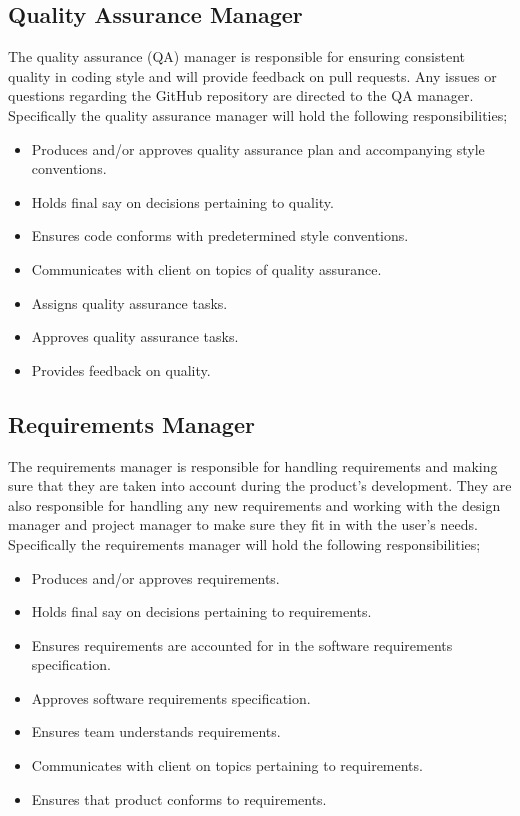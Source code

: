 \documentclass{article}
\begin{document}
\begin{adjustwidth}{0em}{0pt}
\subsection{Quality Assurance Manager}
\begin{adjustwidth}{1em}{0pt}
The quality assurance (QA) manager is responsible for ensuring consistent quality in coding style and will provide feedback on pull requests. Any issues or questions regarding the GitHub repository are directed to the QA manager. Specifically the quality assurance manager will hold the following responsibilities;
\begin{itemize}
\item Produces and/or approves quality assurance plan and accompanying style conventions.
\item Holds final say on decisions pertaining to quality. 
\item Ensures code conforms with predetermined style conventions.
\item Communicates with client on topics of quality assurance. 
\item Assigns quality assurance tasks.
\item Approves quality assurance tasks.
\item Provides feedback on quality. 
\end{itemize}
\end{adjustwidth}

\subsection{Requirements Manager}
\begin{adjustwidth}{1em}{0pt}
The requirements manager is responsible for handling requirements and making sure that they are taken into account during the product's development. They are also responsible for handling any new requirements and working with the design manager and project manager to make sure they fit in with the user's needs. Specifically the requirements manager will hold the following responsibilities;
\begin{itemize}
\item Produces and/or approves requirements.
\item Holds final say on decisions pertaining to requirements. 
\item Ensures requirements are accounted for in the software requirements specification. 
\item Approves software requirements specification.
\item Ensures team understands requirements.
\item Communicates with client on topics pertaining to requirements.
\item Ensures that product conforms to requirements. 
\end{itemize} 
\end{adjustwidth}


\end{adjustwidth}
\end{document}

